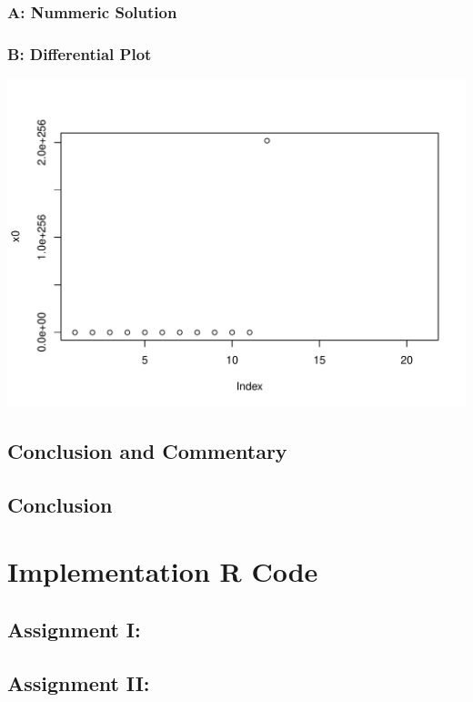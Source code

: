 \documentclass[12pt]{article}
\begin{document}
\subsubsection{A: Nummeric Solution}

\subsubsection{B: Differential Plot}
\includegraphics[scale=0.6]{N.pdf}

\subsection{Conclusion and Commentary}

\subsection{Conclusion}

\newpage
\appendix
\section{Implementation R Code}
\subsection{Assignment I:}

\subsection{Assignment II: }

\end{document}
